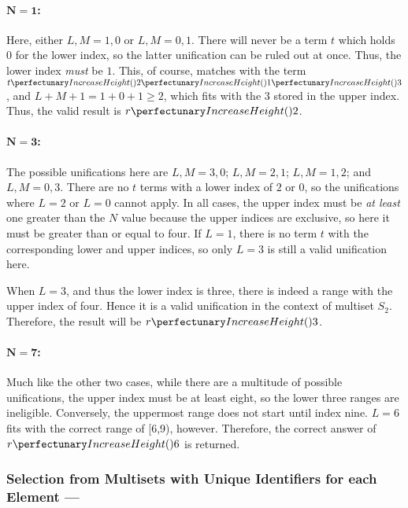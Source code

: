 \paragraph{\(\mathbf{N = 1}\):}  Here, either \(L,M = 1,0\) or \(L,M = 0,1\).  There will never be a term \(t\) which holds \(0\) for the lower index, so the latter unification can be ruled out at once.  Thus, the lower index \emph{must} be \(1\).  This, of course, matches with the term \(\cpfuncnn{t}{2}{1}{3}\), and \(L + M + 1 = 1 + 0 + 1 \geq 2\), which fits with the \(3\) stored in the upper index.  Thus, the valid result is \(\cpfunc{r}{2}\).

\paragraph{\(\mathbf{N = 3}\):}  The possible unifications here are \(L,M = 3,0\); \(L,M = 2,1\); \(L,M = 1,2\); and \(L,M = 0,3\).  There are no \(t\) terms with a lower index of \(2\) or \(0\), so the unifications where \(L = 2\) or \(L = 0\) cannot apply.  In all cases, the upper index must be \emph{at least} one greater than the \(N\) value because the upper indices are exclusive, so here it must be greater than or equal to four.  If \(L = 1\), there is no term \(t\) with the corresponding lower and upper indices, so only \(L = 3\) is still a valid unification here.

When \(L = 3\), and thus the lower index is three, there is indeed a range with the upper index of four.   Hence it is a valid unification in the context of multiset \(S_2\).  Therefore, the result will be \(\cpfunc{r}{3}\).

\paragraph{\(\mathbf{N = 7}\):}  Much like the other two cases, while there are a multitude of possible unifications, the upper index must be at least eight, so the lower three ranges are ineligible.  Conversely, the uppermost range does not start until index nine.  \(L = 6\) fits with the correct range of [6,9), however.  Therefore, the correct answer of \(\cpfunc{r}{6}\) is returned.

\subsubsection{Selection from Multisets with Unique Identifiers for each Element --- }\label{sec:median:selectmultisetid}

